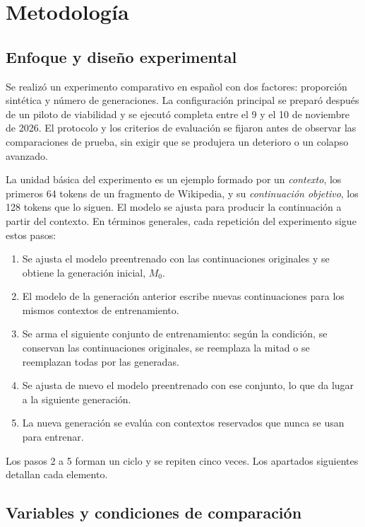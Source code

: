 \documentclass[12pt,letterpaper]{article}
\begin{document}
\section{Metodología}

\subsection{Enfoque y diseño experimental}

Se realizó un experimento comparativo en español con dos factores:
proporción sintética y número de generaciones. La configuración principal
se preparó después de un piloto de viabilidad y se ejecutó completa entre
el 9 y el 10 de noviembre de 2026. El protocolo y los criterios de
evaluación se fijaron antes de observar las comparaciones de prueba, sin
exigir que se produjera un deterioro o un colapso avanzado.

La unidad básica del experimento es un ejemplo formado por un
\textit{contexto}, los primeros 64 tokens de un fragmento de Wikipedia, y
su \textit{continuación objetivo}, los 128 tokens que lo siguen. El modelo
se ajusta para producir la continuación a partir del contexto. En términos
generales, cada repetición del experimento sigue estos pasos:
\begin{enumerate}
    \item Se ajusta el modelo preentrenado con las continuaciones originales
    y se obtiene la generación inicial, \(M_0\).
    \item El modelo de la generación anterior escribe nuevas continuaciones
    para los mismos contextos de entrenamiento.
    \item Se arma el siguiente conjunto de entrenamiento: según la
    condición, se conservan las continuaciones originales, se reemplaza la
    mitad o se reemplazan todas por las generadas.
    \item Se ajusta de nuevo el modelo preentrenado con ese conjunto, lo que
    da lugar a la siguiente generación.
    \item La nueva generación se evalúa con contextos reservados que nunca
    se usan para entrenar.
\end{enumerate}
Los pasos 2 a 5 forman un ciclo y se repiten cinco veces. Los apartados
siguientes detallan cada elemento.

\subsection{Variables y condiciones de comparación}
\end{document}
